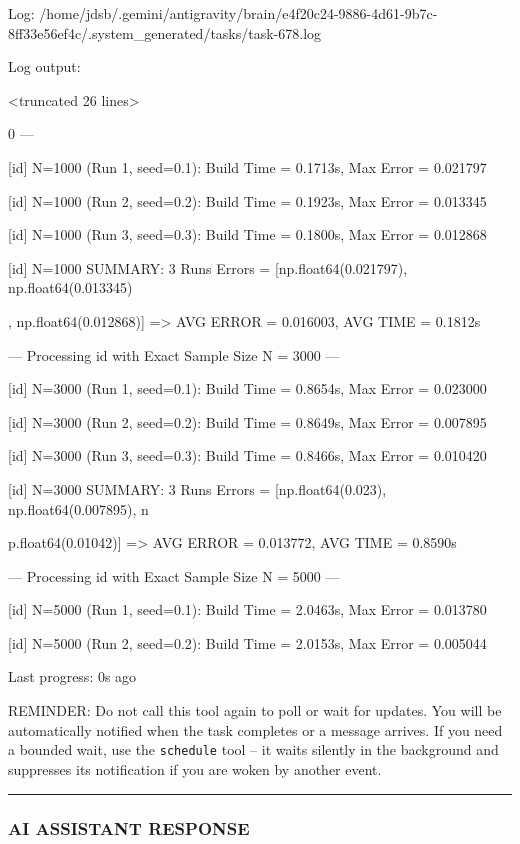 \documentclass[11pt,a4paper]{article}
\begin{document}
Log: /home/jdsb/.gemini/antigravity/brain/e4f20c24-9886-4d61-9b7c-8ff33e56ef4c/.system\_generated/tasks/task-678.log

Log output:

<truncated 26 lines>

0 ---

[id] N=1000 (Run 1, seed=0.1): Build Time = 0.1713s, Max Error = 0.021797

[id] N=1000 (Run 2, seed=0.2): Build Time = 0.1923s, Max Error = 0.013345

[id] N=1000 (Run 3, seed=0.3): Build Time = 0.1800s, Max Error = 0.012868

[id] N=1000 SUMMARY: 3 Runs Errors = [np.float64(0.021797), np.float64(0.013345)

, np.float64(0.012868)] => AVG ERROR = 0.016003, AVG TIME = 0.1812s

--- Processing id with Exact Sample Size N = 3000 ---

[id] N=3000 (Run 1, seed=0.1): Build Time = 0.8654s, Max Error = 0.023000

[id] N=3000 (Run 2, seed=0.2): Build Time = 0.8649s, Max Error = 0.007895

[id] N=3000 (Run 3, seed=0.3): Build Time = 0.8466s, Max Error = 0.010420

[id] N=3000 SUMMARY: 3 Runs Errors = [np.float64(0.023), np.float64(0.007895), n

p.float64(0.01042)] => AVG ERROR = 0.013772, AVG TIME = 0.8590s

--- Processing id with Exact Sample Size N = 5000 ---

[id] N=5000 (Run 1, seed=0.1): Build Time = 2.0463s, Max Error = 0.013780

[id] N=5000 (Run 2, seed=0.2): Build Time = 2.0153s, Max Error = 0.005044


Last progress: 0s ago



REMINDER: Do not call this tool again to poll or wait for updates. You will be automatically notified when the task completes or a message arrives. If you need a bounded wait, use the \texttt{schedule} tool -- it waits silently in the background and suppresses its notification if you are woken by another event.


\hrule

\subsubsection{AI ASSISTANT RESPONSE}
\end{document}
